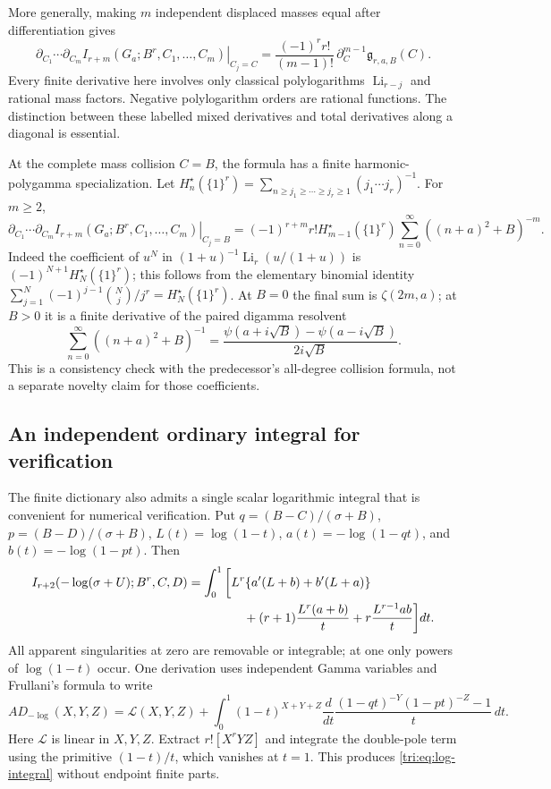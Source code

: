\documentclass[11pt,a4paper]{article}
\theoremstyle{definition}
\theoremstyle{remark}
\numberwithin{equation}{section}
\begin{document}
More generally, making $m$ independent displaced masses equal
after differentiation gives
\begin{equation}\label{tri:eq:confluent}
 \left.\partial_{C_1}\cdots\partial_{C_m}
 I_{r+m}(G_a;B^r,C_1,\ldots,C_m)\right|_{C_j=C}
 =\frac{(-1)^r r!}{(m-1)!}\,
                    \partial_C^{m-1}\mathfrak g_{r,a,B}(C).
\end{equation}
Every finite derivative here involves only classical polylogarithms
$\operatorname{Li}_{r-j}$ and rational mass factors. Negative
polylogarithm orders are rational functions. The distinction
between these labelled mixed derivatives and total derivatives
along a diagonal is essential.

At the complete mass collision $C=B$, the formula has a finite
harmonic-polygamma specialization. Let
$H_n^\star(\{1\}^r)=\sum_{n\ge j_1\ge\cdots\ge j_r\ge1}
(j_1\cdots j_r)^{-1}$. For $m\ge2$,
\begin{equation}\label{tri:eq:complete-collision}
 \left.\partial_{C_1}\cdots\partial_{C_m}
 I_{r+m}(G_a;B^r,C_1,\ldots,C_m)\right|_{C_j=B}
 =(-1)^{r+m}r!H_{m-1}^\star(\{1\}^r)
             \sum_{n=0}^{\infty}((n+a)^2+B)^{-m}.
\end{equation}
Indeed the coefficient of $u^N$ in
$(1+u)^{-1}\operatorname{Li}_r(u/(1+u))$ is
$(-1)^{N+1}H_N^\star(\{1\}^r)$; this follows from the elementary
binomial identity
$\sum_{j=1}^N(-1)^{j-1}\binom Nj/j^r=H_N^\star(\{1\}^r)$.
At $B=0$ the final sum is $\zeta(2m,a)$; at $B>0$ it is a
finite derivative of the paired digamma resolvent
\[
 \sum_{n=0}^{\infty}((n+a)^2+B)^{-1}
  =\frac{\psi(a+i\sqrt B)-\psi(a-i\sqrt B)}{2i\sqrt B}.
\]
This is a consistency check with the predecessor's all-degree
collision formula, not a separate novelty claim for those
coefficients.

\subsection{An independent ordinary integral for verification}

The finite dictionary also admits a single scalar logarithmic
integral that is convenient for numerical verification. Put
$q=(B-C)/(\sigma+B)$, $p=(B-D)/(\sigma+B)$,
$L(t)=\log(1-t)$, $a(t)=-\log(1-qt)$, and
$b(t)=-\log(1-pt)$. Then
\begin{align}\label{tri:eq:log-integral}
 I_{r+2}(-\log(\sigma+U);B^r,C,D)
  =\int_0^1\bigg[&L^r\{a'(L+b)+b'(L+a)\}\notag\\
       &\quad +(r+1)\frac{L^r(a+b)}t
       +r\frac{L^{r-1}ab}t\bigg]dt.
\end{align}
All apparent singularities at zero are removable or integrable;
at one only powers of $\log(1-t)$ occur. One derivation uses
independent Gamma variables and Frullani's formula to write
\[
 A D_{-\log}(X,Y,Z)
   =\mathcal L(X,Y,Z)
     +\int_0^1(1-t)^{X+Y+Z}
       \frac{d}{dt}\frac{(1-qt)^{-Y}(1-pt)^{-Z}-1}{t}\,dt.
\]
Here $\mathcal L$ is linear in $X,Y,Z$.
Extract $r![X^rYZ]$ and integrate the double-pole term using
the primitive $(1-t)/t$, which vanishes at $t=1$.
This produces \eqref{tri:eq:log-integral} without endpoint
finite parts.
\end{document}
